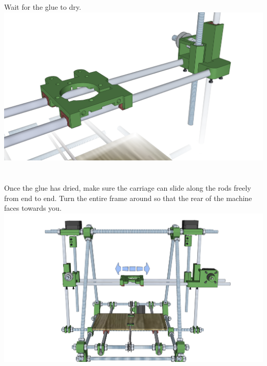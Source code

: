 \documentclass[twoside,openany,a4paper,titlepage]{memoir}
\begin{document}
	\section{}
	Wait for the glue to dry.\\
	\includegraphics[width=1\linewidth]{graphics/ch9_10.png}
	
	\section{}
	Once the glue has dried, make sure the carriage can slide along the rods freely from end to end. Turn
	the entire frame around so that the rear of the machine faces towards you.\\
	\includegraphics[width=1\linewidth]{graphics/ch9_11.png}
	
\end{document}
